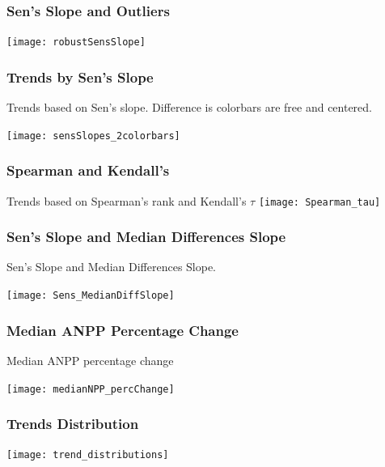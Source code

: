 \documentclass[serif, xcolor={dvipsnames}]{beamer} %
\begin{document}
\begin{frame}
 \frametitle{Sen's Slope and Outliers}
\begin{center}
\texttt{[image: robustSensSlope]}
\end{center}
\end{frame}
\begin{frame}
\frametitle{Trends by Sen's Slope}
Trends based on Sen's slope. Difference is colorbars
are free and centered.
\begin{center}
\texttt{[image: sensSlopes\_2colorbars]}
\end{center}
\end{frame}
\begin{frame}
\frametitle{Spearman and Kendall's}
Trends based on Spearman's rank and Kendall's $\tau$
\hspace*{-1cm}
\texttt{[image: Spearman\_tau]}
\end{frame}
\begin{frame}
\frametitle{Sen's Slope and Median Differences Slope}
Sen's Slope and Median Differences Slope.
\begin{center}
\texttt{[image: Sens\_MedianDiffSlope]}
\end{center}
\end{frame}
\begin{frame}
\frametitle{Median ANPP Percentage Change}
Median ANPP percentage change
\begin{center}
\texttt{[image: medianNPP\_percChange]}
\end{center}
\end{frame}
\begin{frame}
\frametitle{Trends Distribution}
\begin{center}
\texttt{[image: trend\_distributions]}
\end{center}
\end{frame}
\end{document}
